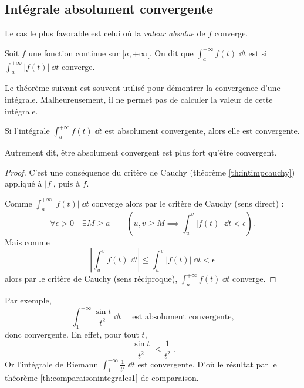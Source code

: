 \documentclass[class=report,crop=false]{standalone}
\begin{document}
\subsection{Intégrale absolument convergente}

Le cas le plus favorable est celui où la \emph{valeur absolue} de $f$
converge.

\begin{definition}
Soit $f$ une fonction continue sur $[a,+\infty[$. On dit que
  $\int_a^{+\infty} f(t)\;\dd t$ est  si 
$\int_a^{+\infty} \big|f(t)\big|\;\dd t$ converge.
\end{definition}

Le théorème suivant est souvent utilisé pour démontrer la
convergence d'une intégrale. Malheureusement, il ne permet pas de
calculer la valeur de cette intégrale. 

\begin{theoreme}
\label{th:acvimpliquecv}
Si l'intégrale $\int_a^{+\infty} f(t)\;\dd t$ est absolument
convergente, alors elle est convergente. 
\end{theoreme}

Autrement dit, être absolument convergent est plus fort qu'être convergent.


\begin{proof} 
C'est une conséquence du critère de Cauchy (théorème \ref{th:intimpcauchy})
appliqué à $|f|$, puis à $f$.

Comme $\int_a^{+\infty} \big|f(t)\big| \; \dd t$ converge
alors par le critère de Cauchy (sens direct) :
$$\forall \epsilon>0  \quad \exists  M \ge a \qquad
\left( u,v \ge M \implies \int_u^v \big|f(t)\big| \;\dd t<\epsilon\right).$$
Mais comme 
$$\left|\int_u^v f(t) \;\dd t\right| \le \int_u^v \big|f(t)\big| \;\dd t < \epsilon$$
alors par le critère de Cauchy (sens réciproque),
$\int_a^{+\infty} f(t) \; \dd t$ converge.
\end{proof}


\begin{exemple}
Par exemple,
$$\int_1^{+\infty} \frac{\sin t}{t^2}\;\dd t\quad\text{ est absolument convergente,}$$
donc convergente. 
En effet, pour tout $t$,
$$\frac{|\sin t |}{t^2}\le \frac{1}{t^2}\;.$$
Or l'intégrale de Riemann $\int_1^{+\infty} \frac{1}{t^2}\;\dd t$ est
convergente. D'où le résultat par le théorème \ref{th:comparaisonintegrales1} de comparaison.  
\end{exemple}
\end{document}
